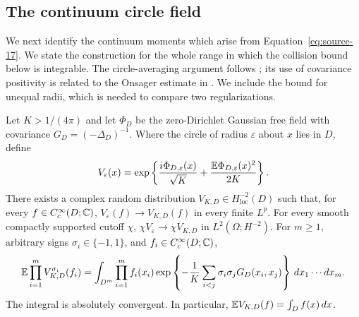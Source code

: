 \subsection{The continuum circle field}

We next identify the continuum moments which arise from
Equation~\eqref{eq:source-17}.  We state the construction for the
whole range in which the collision bound below is integrable.
The circle-averaging argument follows \cite[Lemma~5.11]{B};
its use of covariance positivity is related to the Onsager estimate
in \cite[Proposition~3.9]{JSW2020}.  We include the bound for unequal
radii, which is needed to compare two regularizations.

\begin{lemma}
\label{fields:circle-chaos}
Let $K>1/(4\pi)$ and let $\Phi_D$ be the zero-Dirichlet Gaussian free
field with covariance $G_D=(-\Delta_D)^{-1}$.  Where the circle of
radius $\varepsilon$ about $x$ lies in $D$, define
\[
 V_\varepsilon(x)=
 \exp\left\{\frac{i\Phi_{D,\varepsilon}(x)}{\sqrt K}
        +\frac{\mathbb E\Phi_{D,\varepsilon}(x)^2}{2K}\right\}.
\]
There exists a complex random distribution
$V_{K,D}\in H^{-2}_{\mathrm{loc}}(D)$ such that, for every
$f\in C_c^\infty(D;\mathbb C)$,
$V_\varepsilon(f)\to V_{K,D}(f)$ in every finite $L^p$.
For every smooth compactly supported cutoff $\chi$,
$\chi V_\varepsilon\to\chi V_{K,D}$ in
$L^2(\Omega;H^{-2})$.
For $m\geq1$, arbitrary signs $\sigma_i\in\{-1,1\}$, and
$f_i\in C_c^\infty(D;\mathbb C)$,
\begin{equation}\label{fields:continuum-moments}
 \mathbb E\prod_{i=1}^m V_{K,D}^{\sigma_i}(f_i)
 =\int_{D^m}\prod_{i=1}^m f_i(x_i)
    \exp\left\{-\frac1K\sum_{i<j}\sigma_i\sigma_j
                         G_D(x_i,x_j)\right\}
                  \,dx_1\cdots dx_m.
\end{equation}
The integral is absolutely convergent.  In particular,
$\mathbb E V_{K,D}(f)=\int_D f(x)\,dx$.
\end{lemma}

